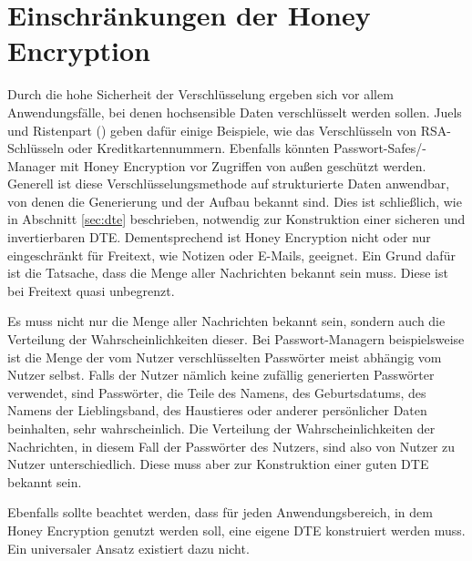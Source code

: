 \section{Einschränkungen der Honey Encryption}
\label{sec:probleme}
Durch die hohe Sicherheit der Verschlüsselung ergeben sich vor allem Anwendungsfälle, bei denen hochsensible Daten verschlüsselt werden sollen. Juels und Ristenpart (\cite{EURO2014, IEEE2014}) geben dafür einige Beispiele, wie das Verschlüsseln von RSA-Schlüsseln oder Kreditkartennummern. Ebenfalls könnten Passwort-Safes/-Manager mit Honey Encryption vor Zugriffen von außen geschützt werden. Generell ist diese Verschlüsselungsmethode auf strukturierte Daten anwendbar, von denen die Generierung und der Aufbau bekannt sind. Dies ist schließlich, wie in Abschnitt \ref{sec:dte} beschrieben, notwendig zur Konstruktion einer sicheren und invertierbaren DTE. Dementsprechend ist Honey Encryption nicht oder nur eingeschränkt für Freitext, wie Notizen oder E-Mails, geeignet. Ein Grund dafür ist die Tatsache, dass die Menge aller Nachrichten bekannt sein muss. Diese ist bei Freitext quasi unbegrenzt.

Es muss nicht nur die Menge aller Nachrichten bekannt sein, sondern auch die Verteilung der Wahrscheinlichkeiten dieser. Bei Passwort-Managern beispielsweise ist die Menge der vom Nutzer verschlüsselten Passwörter meist abhängig vom Nutzer selbst. Falls der Nutzer nämlich keine zufällig generierten Passwörter verwendet, sind Passwörter, die Teile des Namens, des Geburtsdatums, des Namens der Lieblingsband, des Haustieres oder anderer persönlicher Daten beinhalten, sehr wahrscheinlich. Die Verteilung der Wahrscheinlichkeiten der Nachrichten, in diesem Fall der Passwörter des Nutzers, sind also von Nutzer zu Nutzer unterschiedlich. Diese muss aber zur Konstruktion einer guten DTE bekannt sein.

Ebenfalls sollte beachtet werden, dass für jeden Anwendungsbereich, in dem Honey Encryption genutzt werden soll, eine eigene DTE konstruiert werden muss. Ein universaler Ansatz existiert dazu nicht.

